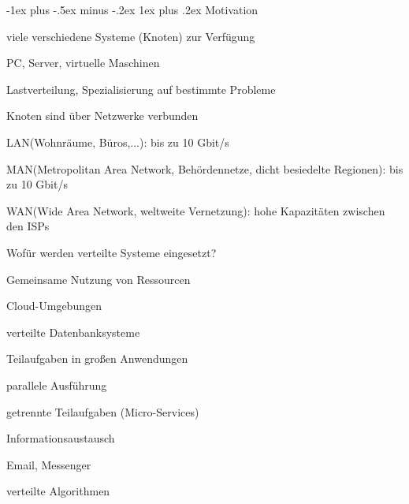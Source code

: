 \documentclass[10pt]{article}
\makeatletter
\renewcommand{\subsubsection}{\@startsection{subsubsection}{3}{0mm}%
                                {-1ex plus -.5ex minus -.2ex}%
                                {1ex plus .2ex}%
                                {\normalfont\small\bfseries}}
\makeatother
\begin{document}
\subsubsection{Motivation}
\begin{itemize*}
  \item viele verschiedene Systeme (Knoten) zur Verfügung
  \begin{itemize*}
    \item PC, Server, virtuelle Maschinen
    \item Lastverteilung, Spezialisierung auf bestimmte Probleme
  \end{itemize*}
  \item Knoten sind über Netzwerke verbunden
  \begin{itemize*}
    \item LAN(Wohnräume, Büros,...): bis zu 10 Gbit/s
    \item MAN(Metropolitan Area Network, Behördennetze, dicht besiedelte Regionen): bis zu 10 Gbit/s
    \item WAN(Wide Area Network, weltweite Vernetzung): hohe Kapazitäten zwischen den ISPs
  \end{itemize*}
\end{itemize*}

Wofür werden verteilte Systeme eingesetzt? 
\begin{itemize*}
  \item Gemeinsame Nutzung von Ressourcen
  \begin{itemize*}
    \item Cloud-Umgebungen
    \item verteilte Datenbanksysteme
  \end{itemize*}
  \item Teilaufgaben in großen Anwendungen
  \begin{itemize*}
    \item parallele Ausführung
    \item getrennte Teilaufgaben (Micro-Services)
  \end{itemize*}
  \item Informationsaustausch
  \begin{itemize*}
    \item Email, Messenger
    \item verteilte Algorithmen
  \end{itemize*}
\end{itemize*}
\end{document}

